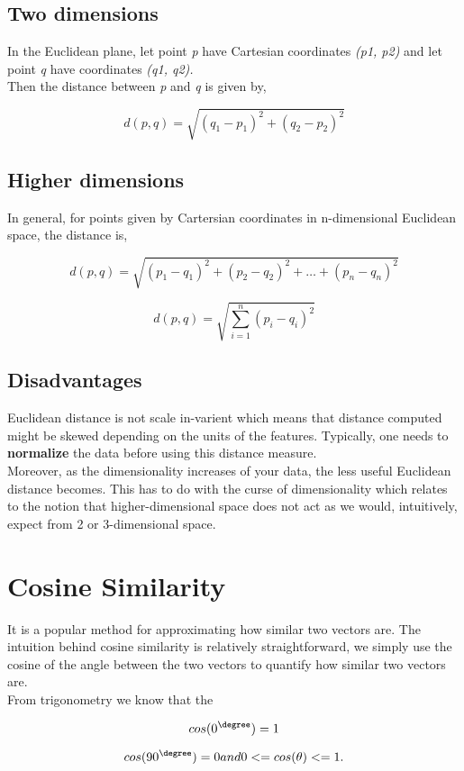 \documentclass[11pt]{article}
\begin{document}
\subsection{Two dimensions}
\label{sec:orga7cd196}
In the Euclidean plane, let point \emph{p} have Cartesian coordinates \emph{(p1,
p2)} and let point \emph{q} have coordinates \emph{(q1, q2).}\\
Then the distance between \emph{p} and \emph{q} is given by,

$$
d(p, q) = \sqrt{(q_1-p_1)^2+(q_2-p_2)^2}
$$

\subsection{Higher dimensions}
\label{sec:org8d21443}
In general, for points given by Cartersian coordinates in n-dimensional
Euclidean space, the distance is,

$$
d(p,q) = \sqrt{(p_1-q_1)^2+(p_2-q_2)^2+\dots+(p_n-q_n)^2}
$$

$$
d(p, q) = \sqrt{\sum_{i=1}^n(p_i-q_i)^2}
$$

\subsection{Disadvantages}
\label{sec:org4cd1dd1}
Euclidean distance is not scale in-varient which means that distance
computed might be skewed depending on the units of the features.
Typically, one needs to \textbf{normalize} the data before using this distance
measure.\\
Moreover, as the dimensionality increases of your data, the less useful
Euclidean distance becomes. This has to do with the curse of
dimensionality which relates to the notion that higher-dimensional space
does not act as we would, intuitively, expect from 2 or 3-dimensional
space.

\section{Cosine Similarity}
\label{sec:org6d20852}
It is a popular method for approximating how similar two vectors are.
The intuition behind cosine similarity is relatively straightforward, we
simply use the cosine of the angle between the two vectors to quantify
how similar two vectors are.\\
From trigonometry we know that the

$$
cos(0^\degree) = 1
$$

$$
cos(90^\degree) = 0 \space and \space 0 <= cos(\theta) <= 1.
$$
\end{document}
